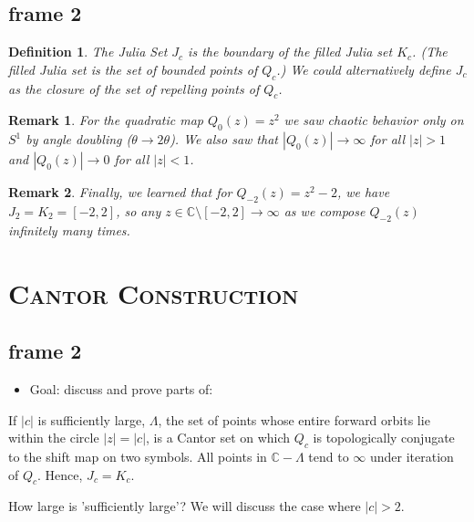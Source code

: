 \documentclass[xcolor=x11names,compress]{beamer}
\renewcommand{\(}{\begin{columns}}
\renewcommand{\)}{\end{columns}}
\newcommand{\<}[1]{\begin{column}{#1}}
\renewcommand{\>}{\end{column}}
\newtheorem{defn}{Definition}
\newtheorem{rmk}{Remark}
\begin{document}
\subsection{frame 2}
\begin{frame}
\begin{defn}
The Julia Set $J_c$ is the boundary of the filled Julia set $K_c$. (The filled Julia set is the set of bounded points of $Q_c$.) We could alternatively define $J_c$ as the closure of the set of repelling points of $Q_c$.
\end{defn}
\pause
\begin{rmk}
For the quadratic map $Q_0(z) = z^2$ we saw chaotic behavior only on $S^1$ by angle doubling ($\theta \rightarrow 2\theta$). We also saw that $|Q_0(z)| \rightarrow \infty$ for all $|z| > 1$ and $|Q_0(z)| \rightarrow 0$ for all $|z| < 1$.
\end{rmk}
\pause
\begin{rmk}
Finally, we learned that for $Q_{-2}(z) = z^2 - 2$, we have $J_2 = K_2 = [-2, 2]$, so any $z \in \mathbb{C} \setminus [-2,2] \rightarrow \infty$ as we compose $Q_{-2}(z)$ infinitely many times.
\end{rmk}
\end{frame}
\section{\scshape Cantor Construction}
\subsection{frame 2}
\begin{frame}
\begin{itemize}
\item Goal: discuss and prove parts of:
\end{itemize}
\vspace{.7cm}
\begin{theorem}
If $|c|$ is sufficiently large, $\Lambda$, the set of points whose entire forward orbits lie within the circle $|z|=|c|$, is a Cantor set on which $Q_c$ is topologically conjugate to the shift map on two symbols. All points in $\mathbb{C} - \Lambda$ tend to $\infty$ under iteration of $Q_c$. Hence, $J_c=K_c$.
\end{theorem}
\vspace{.7cm}
How large is 'sufficiently large'? We will discuss the case where $|c| > 2$.
\end{frame}
\end{document}
